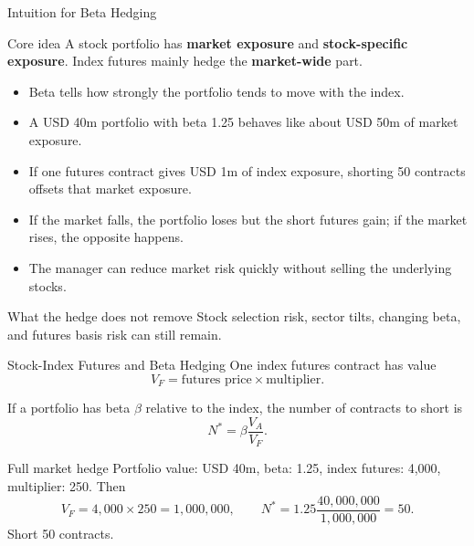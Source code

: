 \documentclass[aspectratio=169,11pt]{beamer}
\begin{document}
\begin{frame}{Intuition for Beta Hedging}
    \small
    \begin{block}{Core idea}
        A stock portfolio has \textbf{market exposure} and \textbf{stock-specific exposure}.
        Index futures mainly hedge the \textbf{market-wide} part.
    \end{block}

    \begin{itemize}
        \item Beta tells how strongly the portfolio tends to move with the index.
        \item A USD 40m portfolio with beta 1.25 behaves like about USD 50m of market exposure.
        \item If one futures contract gives USD 1m of index exposure, shorting 50 contracts offsets that market exposure.
        \item If the market falls, the portfolio loses but the short futures gain; if the market rises, the opposite happens.
        \item The manager can reduce market risk quickly without selling the underlying stocks.
    \end{itemize}

    \begin{alertblock}{What the hedge does not remove}
        Stock selection risk, sector tilts, changing beta, and futures basis risk can still remain.
    \end{alertblock}
\end{frame}

\begin{frame}{Stock-Index Futures and Beta Hedging}
    \small
    One index futures contract has value
    \[
        V_F=\text{futures price}\times \text{multiplier}.
    \]

    If a portfolio has beta $\beta$ relative to the index, the number of contracts to short is
    \[
        N^*=\beta\frac{V_A}{V_F}.
    \]

    \begin{exampleblock}{Full market hedge}
        Portfolio value: USD 40m, beta: 1.25, index futures: 4,000, multiplier: 250.
        Then
        \[
            V_F=4{,}000\times 250=1{,}000{,}000,
            \qquad
            N^*=1.25\frac{40{,}000{,}000}{1{,}000{,}000}=50.
        \]
        Short 50 contracts.
    \end{exampleblock}
\end{frame}
\end{document}
